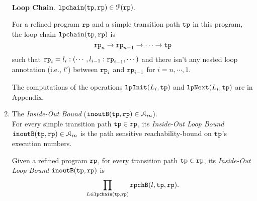 \begin{enumerate}
\\
\textbf{Loop Chain}.  ${\mathtt{lpchain}}({\mathtt{tp}}, {\mathtt{rp}}) \in \mathcal{P}({\mathtt{rp}})$.
\begin{defn}
  \label{def:loopchain}
For a refined program ${\mathtt{rp}}$ and a simple transition path ${\mathtt{tp}}$ in this program, the loop chain ${\mathtt{lpchain}}({\mathtt{tp}}, {\mathtt{rp}})$
is
%
\[ 
{\mathtt{rp}}_n \to {\mathtt{rp}}_{n-1} \to \cdots \to {\mathtt{tp}}
\]
such that 
${\mathtt{rp}}_{i}= l_i : (\cdots, l_{i - 1} : {\mathtt{rp}}_{i-1}, \cdots)$ and
 there isn't any nested loop annotation (i.e., $l'$) between ${\mathtt{rp}}_{i}$ and ${\mathtt{rp}}_{i - 1}$ for $i = n, \cdots, 1$.
\end{defn}
%
The computations of the operations ${\mathtt{lpInit}}(L_i, {\mathtt{tp}})$ and ${\mathtt{lpNext}}(L_i, {\mathtt{tp}})$ are in Appendix.
%
\item The \emph{Inside-Out Bound} (${\mathtt{inoutB}}({\mathtt{tp}}, {\mathtt{rp}}) \in \mathcal{A}_{in}$).
\\
For every simple transition path ${\mathtt{tp}} \in {\mathtt{rp}}$,
its \emph{Inside-Out Loop Bound}
 ${\mathtt{inoutB}}({\mathtt{tp}}, {\mathtt{rp}}) \in \mathcal{A}_{in}$ is 
the path sensitive reachability-bound on ${\mathtt{tp}}$'s execution numbers.

\begin{defn}
  \label{def:outin_bound}
  Given a refined program ${\mathtt{rp}}$, for every transition path ${\mathtt{tp}} \in {\mathtt{rp}}$, 
  its \emph{Inside-Out Loop Bound}
  ${\mathtt{inoutB}}({\mathtt{tp}}, {\mathtt{rp}})$ is 
\[
  \prod\limits_{L \in {\mathtt{lpchain}}({\mathtt{tp}}, {\mathtt{rp}})} {\mathtt{rpchB}}(l, {\mathtt{tp}}, {\mathtt{rp}}).
\]
\end{defn}
\end{enumerate}
